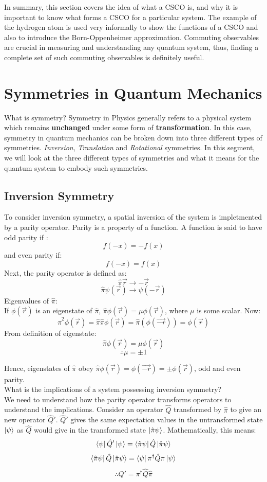 \documentclass{article}
\begin{document}
\begin{flushleft}
In summary, this section covers the idea of what a CSCO is, and why it is important to know what forms a CSCO for a particular system. The example of the hydrogen atom is used very informally to show the functions of a CSCO and also to introduce the Born-Oppenheimer approximation. Commuting observables are crucial in measuring and understanding any quantum system, thus, finding a complete set of such commuting observables is definitely useful.
\pagebreak

\section{Symmetries in Quantum Mechanics}

What is symmetry? Symmetry in Physics generally refers to a physical system which remains \textbf{unchanged} under some form of \textbf{transformation}. In this case, symmetry in quantum mechanics can be broken down into three different types of symmetries. \textit{Inversion}, \textit{Translation} and \textit{Rotational} symmetries. In this segment, we will look at the three different types of symmetries and what it means for the quantum system to embody such symmetries.

\subsection{Inversion Symmetry}

To consider inversion symmetry, a spatial inversion of the system is impletmented by a parity operator. Parity is a property of a function. A function is said to have odd parity if :
$$f(-x)=-f(x)$$
and even parity if:
$$f(-x)=f(x)$$
Next, the parity operator is defined as:
$$\hat{\pi}\vec{r}\rightarrow -\vec{r}$$
$$\hat{\pi}\psi(\vec{r})\rightarrow\psi(-\vec{r})$$
Eigenvalues of $\hat{\pi}$:\\
If $\phi(\vec{r})$ is an eigenstate of $\hat{\pi}$, $\hat{\pi}\phi(\vec{r})=\mu\phi(\vec{r})$, where $\mu$ is some scalar. Now:
$$\hat{\pi}^2\phi(\vec{r})=\hat{\pi}\hat{\pi}\phi(\vec{r})=\hat{\pi}(\phi(\vec{-r}))=\phi(\vec{r})$$
From definition of eigenstate:
$$\hat{\pi}\phi(\vec{r})=\mu\phi(\vec{r})$$
$$\therefore \mu=\pm 1$$

Hence, eigenstates of $\hat{\pi}$ obey $\hat{\pi}\phi(\vec{r})=\phi(\vec{-r})=\pm\phi(\vec{r})$, odd and even parity.\\[0.5cm]

What is the implications of a system possessing inversion symmetry?\\
We need to understand how the parity operator transforms operators to understand the implications. Consider an operator $\hat{Q}$ transformed by $\hat{\pi}$ to give an new operator $\hat{Q}'$. $\hat{Q}'$ gives the same expectation values in the untransformed state $\ket{\psi}$ as $\hat{Q}$ would give in the transformed state $\ket{\hat{\pi}\psi}$. Mathematically, this means:
$$\bra{\psi}\hat{Q}'\ket{\psi}=\bra{\hat{\pi}\psi}\hat{Q}\ket{\hat{\pi}\psi}$$
$$\bra{\hat{\pi}\psi}\hat{Q}\ket{\hat{\pi}\psi}=\bra{\psi}\pi^\dagger\hat{Q}\pi\ket{\psi}$$
$$\therefore \hat{Q}'=\pi^\dagger\hat{Q}\hat{\pi}$$


\end{flushleft}
\end{document}
